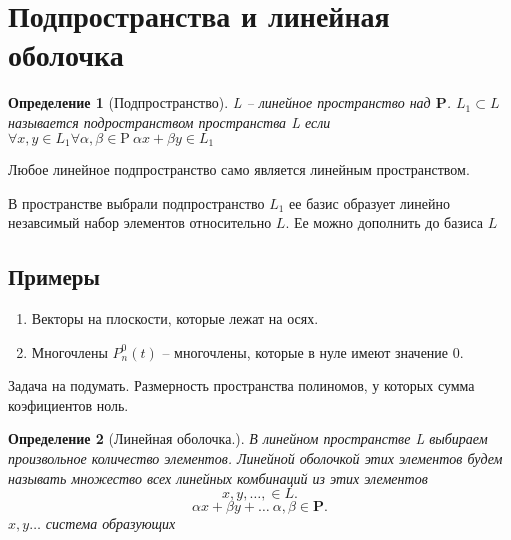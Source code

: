\documentclass{scrartcl}
\newtheorem{definition}{Определение}
\begin{document}
\section{Подпространства и линейная оболочка}
\begin{definition}[Подпространство]
    L -- линейное пространство над $\mathbf{P}$.  $L_1 \subset L$ называется подространством пространства L если $\forall  x, y \in L_1 \forall  \alpha,\beta \in \mathrm{P}
    ~ \alpha x + \beta y \in L_1$
\end{definition}
Любое линейное подпространство само является линейным пространством.

В пространстве выбрали подпространство $L_1$ ее базис образует линейно незавсимый набор элементов относительно $L$. Ее можно дополнить до базиса $L$
\subsection{Примеры}
\begin{enumerate}
    \item Векторы на плоскости, которые лежат на осях.
    \item Многочлены $P^{0}_{n}(t)$ -- многочлены, которые в нуле имеют значение 0.
\end{enumerate}
Задача на подумать. Размерность пространства полиномов, у которых сумма коэфициентов ноль.
\begin{definition}[Линейная оболочка.]
    В линейном пространстве L выбираем произвольное количество элементов. Линейной оболочкой этих элементов будем называть множество всех линейных комбинаций из этих элементов
    \[
    x,y,\dots, \in L
    .\] 
    \[
        \alpha x + \beta y + \dots ~ \alpha,\beta \in \mathbf{P}
    .\] 
    $x,y \dots$ система образующих
\end{definition}
\end{document}
